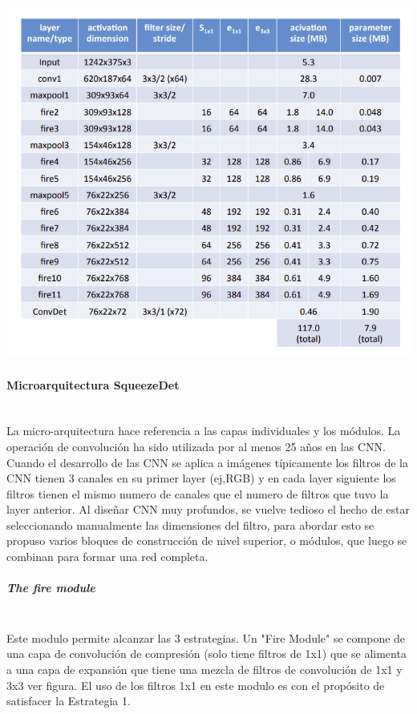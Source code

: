 \begin{center}
    \includegraphics[scale=0.5]{Tesis/Capitulos/03_CAPITULO_1/img/squeezenetmacro.png}
\end{center}

\paragraph{Microarquitectura SqueezeDet}\mbox{}\\

La micro-arquitectura hace referencia a las capas individuales y los módulos. La operación de convolución ha sido utilizada por al menos 25 años en las CNN. Cuando el desarrollo de las CNN se aplica a imágenes típicamente los filtros de la CNN tienen 3 canales en su primer layer (ej,RGB) y en cada layer siguiente los filtros tienen el mismo numero de canales que el numero de filtros que tuvo la layer anterior. Al diseñar CNN muy profundos, se vuelve tedioso el hecho de estar seleccionando manualmente las dimensiones del filtro, para abordar esto se propuso varios bloques de construcción de nivel superior, o módulos, que luego se combinan para formar una red completa.

\subparagraph{The fire module}\mbox{}\\

Este modulo permite alcanzar las 3 estrategias. Un "Fire Module" se compone de una capa de convolución de compresión (solo tiene filtros de 1x1) que se alimenta a una capa de expansión que tiene una mezcla de filtros de convolución de 1x1 y 3x3 ver figura. El uso de los filtros 1x1 en este modulo es con el propósito de satisfacer la Estrategia 1.


